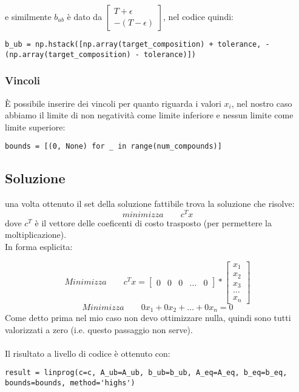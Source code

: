 \documentclass{article}
\begin{document}
e similmente $b_{ub}$ è dato da  $\begin{bmatrix}T + \epsilon \\ -(T-\epsilon)\end{bmatrix}$, nel codice quindi:
\begin{lstlisting}
b_ub = np.hstack([np.array(target_composition) + tolerance, -(np.array(target_composition) - tolerance)])
\end{lstlisting}

\subsubsection{Vincoli}
È possibile inserire dei vincoli per quanto riguarda i valori $x_i$, nel nostro caso abbiamo il limite di non negatività come limite inferiore e nessun limite come limite superiore:
\begin{lstlisting}
bounds = [(0, None) for _ in range(num_compounds)]    
\end{lstlisting}



\subsection{Soluzione}

una volta ottenuto il set della soluzione fattibile trova la soluzione che risolve:
\[minimizza \qquad c^Tx \]
dove $c^T$ è il vettore delle coeficenti di costo trasposto (per permettere la moltiplicazione). \\ In forma esplicita:

\[Minimizza\qquad c^Tx = \begin{bmatrix} 0 & 0 & 0 & \ldots & 0 \end{bmatrix}*\begin{bmatrix} x_1 \\ x_2 \\ x_3 \\ \ldots \\ x_n \end{bmatrix} \]
\[Minimizza\qquad 0x_1+0x_2+\ldots+0x_n = 0\]
Come detto prima nel mio caso non devo ottimizzare nulla, quindi sono tutti valorizzati a zero (i.e. questo passaggio non serve). \\\\Il risultato a livello di codice è ottenuto con:
\begin{lstlisting}
result = linprog(c=c, A_ub=A_ub, b_ub=b_ub, A_eq=A_eq, b_eq=b_eq, bounds=bounds, method='highs')

\end{lstlisting}
\end{document}
